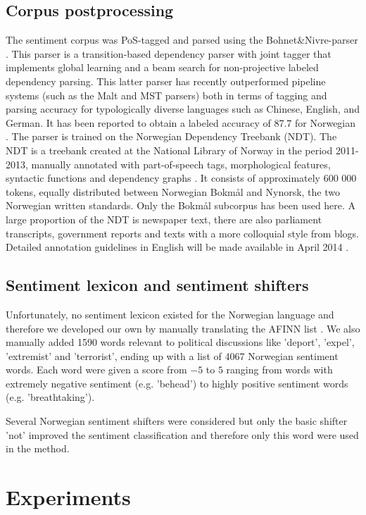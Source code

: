 \documentclass[11pt]{article}
\begin{document}
\subsection{Corpus postprocessing}
The sentiment corpus was PoS-tagged and parsed using the
Bohnet\&Nivre-parser \cite{Boh:Niv:12}. This parser is a
transition-based dependency parser with joint tagger that implements
global learning and a beam search for non-projective labeled
dependency parsing.  This latter parser has recently outperformed
pipeline systems (such as the Malt and MST parsers) both in terms of
tagging and parsing accuracy for typologically diverse languages such
as Chinese, English, and German. It has been reported to obtain a
labeled accuracy of 87.7 for Norwegian \cite{Sol14}.  The parser is
trained on the Norwegian Dependency Treebank (NDT). The NDT is a
treebank created at the National Library of Norway in the period
2011-2013, manually annotated with part-of-speech tags, morphological
features, syntactic functions and dependency graphs \cite{Sol14,
 Sol13}. It consists of approximately 600 000 tokens, equally
distributed between Norwegian Bokm{\aa}l and Nynorsk, the two Norwegian
written standards. Only the Bokm{\aa}l subcorpus has been used here. A
large proportion of the NDT is newspaper text, there are also
parliament transcripts, government reports and texts with a more
colloquial style from blogs. Detailed annotation guidelines in English
will be made available in April 2014 \cite{Kinn2013}.

\subsection{Sentiment lexicon and sentiment shifters}

Unfortunately, no sentiment lexicon existed for the Norwegian language and therefore we developed our own by manually translating the AFINN list \cite{Nielsen11}. We also manually added 1590 words relevant to political discussions  like 'deport', 'expel', 'extremist' and 'terrorist', ending up with a list of 4067 Norwegian sentiment words. Each word were given a score from $-5$ to $5$ ranging from words with extremely negative sentiment (e.g. 'behead') to highly positive sentiment words (e.g. 'breathtaking').

Several Norwegian sentiment shifters were considered but only the basic shifter 'not' improved the sentiment classification and therefore only this word were used in the method.

\section{Experiments}
\end{document}
